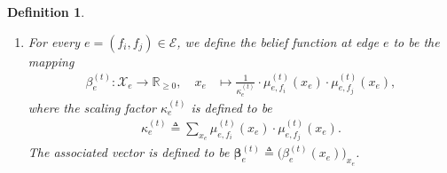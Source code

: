 \documentclass[journal]{IEEEtran}
\newcommand{\add}[1]{{\color{black}#1}}
\newtheorem{definition}[theorem]{Definition}
\newcommand{\vect}[1]{ \bm{#1} }
\newcommand{\set}[1]{\mathcal{#1}}
\newcommand{\beli}{\beta}
\newcommand{\vbeli}{ \vect{\beli} }
\newcommand{\setEfull}{ \mathcal{E} }
\newcommand{\sR}{\mathbb{R}}
\newcommand{\xe}{ x_{e} }
\newcommand{\setxe}{ \mathcal{X}_{e} }
\newcommand{\vmu}{ \vect{ \mu } }
\newcommand{\graphN}{ \mathsf{N} }
\newcommand{\defeq}{ \triangleq }
\newcommand{\ZBSPA}{ Z_{\mathrm{B,SPA}} }
\newcommand{\efi}{ e,f_i }
\newcommand{\efj}{ e,f_j }
\newcommand*{\ie}{\textit{i.e.}}
\begin{document}
\begin{definition}
\begin{enumerate}
\begin{enumerate}
\begin{align*}
                  \end{align*}
                  \add{With this choice of scaling factors, each message sums
                    to one and can thus be viewed as a probability mass
                    function over $\set{X}_e$; the scaling also keeps the
                    message values bounded over the iterations. Importantly,
                    as pointed out in the upcoming
                    Definition~\ref{sec:SNFG:def:2}, the main quantity of
                    interest in this paper, \ie, $\ZBSPA(\graphN,\vmu)$, is
                    invariant under any rescaling of the messages.} The
                  associated message vectors are defined to be
                  $ \vmu_{\efj}^{(t)} \defeq \bigl( \mu_{\efj}^{(t)}(\xe)
                    \bigr)_{ \!  \xe } $ and
                  $ \vmu_{\efi}^{(t)} \defeq \bigl( \mu_{\efi}^{(t)}(\xe)
                    \bigr)_{ \!  \xe } $.

            \item\label{SPA: update belief edges} For every $e = (f_{i},f_{j}) \in \setEfull$, we define the belief function at edge $e$ to be the mapping
                  \begin{align}
                    \beli_e^{(t)}: \setxe \to \sR_{\geq 0}, \quad
                    \xe
                     & \mapsto
                    \frac{1}{\kappa_e^{(t)}}
                    \cdot
                    \mu_{\efi}^{(t)}(\xe) \cdot
                    \mu_{\efj}^{(t)}(\xe),
                    \label{sec:SNFG:eqn:2}
                  \end{align}
                  where the scaling factor $ \kappa_e^{(t)} $ is defined to be
                  \begin{align*}
                    \kappa_e^{(t)} \defeq \sum_{\xe}
                    \mu_{\efi}^{(t)}(\xe) \cdot \mu_{\efj}^{(t)}(\xe).
                  \end{align*}
                  The associated vector is defined to be
                  $ \vbeli_{e}^{(t)} \defeq \bigl( \beli_e^{(t)}(\xe) \bigr)_{ \!  \xe } $.


\end{enumerate}
\end{enumerate}
\end{definition}
\end{document}
